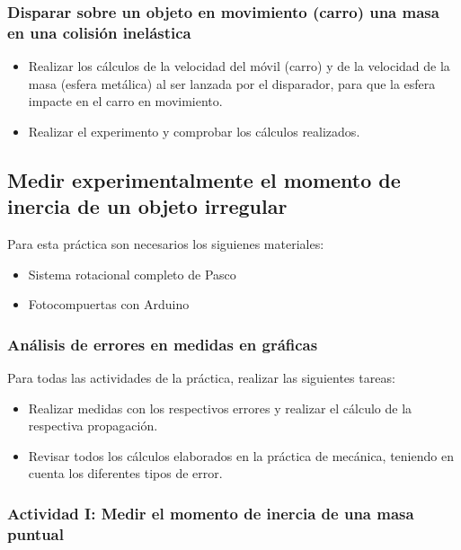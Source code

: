 \documentclass[12pt]{article}
\begin{document}
\subsubsection{Disparar sobre un objeto en movimiento (carro) una masa en una colisión inelástica}

\begin{itemize}
    \item Realizar los cálculos de la velocidad del móvil (carro) y de la velocidad de la masa (esfera metálica) al ser lanzada por el disparador, para que la esfera impacte en el carro en movimiento.
    \item Realizar el experimento y comprobar los cálculos realizados.
\end{itemize}


\subsection{Medir experimentalmente el momento de inercia de un objeto irregular}

Para esta práctica son necesarios los siguienes materiales:

\begin{itemize}
 \item Sistema rotacional completo de Pasco
 \item Fotocompuertas con Arduino
\end{itemize}

\subsubsection{Análisis de errores en medidas en gráficas}
Para todas las actividades de la práctica, realizar las siguientes tareas:
\begin{itemize}
 \item Realizar medidas con los respectivos errores y realizar el cálculo de la respectiva propagación.
 \item Revisar todos los cálculos elaborados en la práctica de mecánica, teniendo en cuenta los diferentes tipos de error.
\end{itemize}

\subsubsection{Actividad I: Medir el momento de inercia de una masa puntual}
\end{document}
